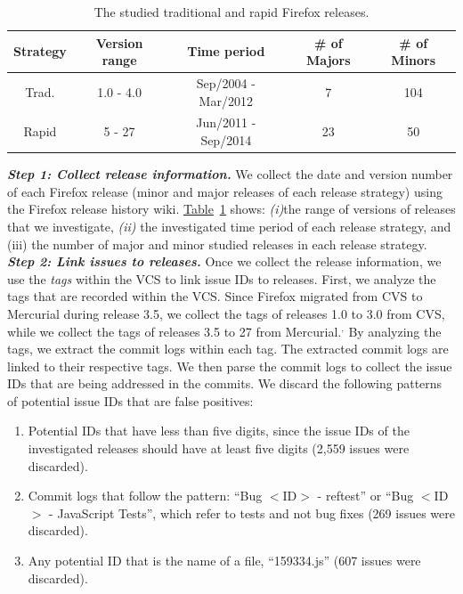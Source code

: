 \begin{table}[!]
	\footnotesize
	\centering
	\caption{The studied traditional and rapid Firefox releases.
	\label{tbl:releases}}
		\begin{tabular}{ccccc}
			\hline 
			\textbf{Strategy} & \textbf{Version range} &
			\textbf{Time period} & \textbf{\# of Majors} &
			\textbf{\# of Minors}\tabularnewline
			\hline 
			\hline 
			Trad. & 1.0 - 4.0 & Sep/2004 - Mar/2012 & 7 & 104\tabularnewline
			\hline 
			Rapid & 5 - 27 & Jun/2011 - Sep/2014 & 23 & 50\tabularnewline
			\hline 
		\end{tabular}%
\end{table}

\noindent\textbf{\textit{Step 1: Collect release information.}} We collect the date and
version number of each Firefox release (minor and major releases of each release
strategy) using the Firefox release history
wiki.
\hyperref[tbl:releases]{Table}~\ref{tbl:releases} shows: {\em (i)}the range of versions of releases that we
investigate, {\em (ii)} the investigated time period of each release strategy, and
(iii) the number of major and minor studied releases in each release strategy.\\

\noindent\textbf{\textit{Step 2: Link issues to releases.}} Once we collect the release
information, we use the \textit{tags} within the VCS to link issue IDs to
releases.  First, we analyze the tags that are recorded within the VCS. Since
Firefox migrated from CVS to Mercurial during release 3.5, we collect the tags
of releases 1.0 to 3.0 from CVS, while we collect the tags of releases 3.5 to 27
from
Mercurial.$^,$
By analyzing the tags, we extract the commit logs within each tag. The extracted
commit logs are linked to their respective tags. We then parse the commit logs
to collect the issue IDs that are being addressed in the commits. We discard the
following patterns of potential issue IDs that are false positives:

\begin{enumerate}
\item Potential IDs that have less than five digits, since the issue IDs of the
	investigated releases should have at least five digits (2,559 issues
	were discarded).  
\item Commit logs that follow the pattern: ``Bug $<$ID$>$ -
	reftest'' or ``Bug $<$ID$>$ - JavaScript Tests'',
	which refer to tests and not bug fixes (269 issues were
	discarded).  
\item Any potential ID that is the name of a file, \eg
	``159334.js'' (607 issues were discarded).
\end{enumerate}          


